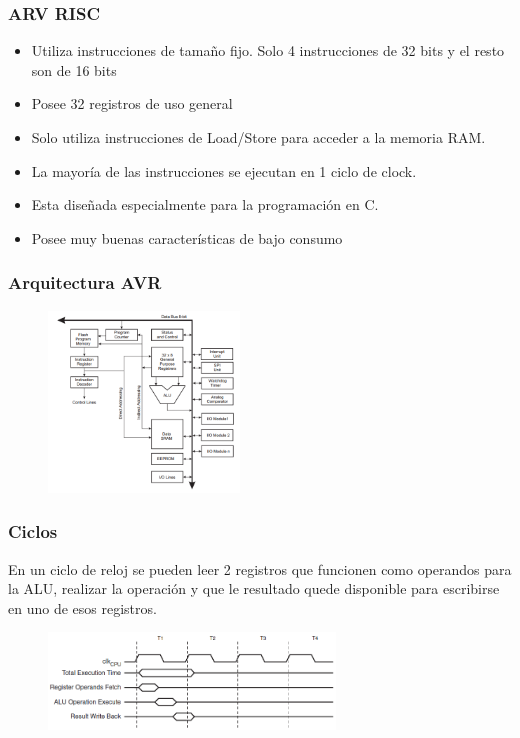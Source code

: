 \documentclass{beamer}
\begin{document}
\begin{frame}
\frametitle{ARV RISC}
\begin{itemize}
\item Utiliza instrucciones de tamaño fijo. Solo 4 instrucciones de 32 bits y el resto son de 16 bits
\item Posee 32 registros de uso general
\item Solo utiliza instrucciones de Load/Store para acceder a la memoria RAM.
\item La mayoría de las instrucciones se ejecutan en 1 ciclo de clock.
\item Esta diseñada especialmente para la programación en C.
\item Posee muy buenas características de bajo consumo
\end{itemize}
\end{frame}

\begin{frame}
\frametitle{Arquitectura AVR}
\begin{figure}[!h]
\centering
\includegraphics[width=2in]{avrarch}
\end{figure}
\end{frame}

\begin{frame}
\frametitle{Ciclos}
En un ciclo de reloj se pueden leer 2 registros que funcionen como operandos para la ALU, realizar la operación y que le resultado quede disponible para escribirse en uno de esos registros.
\begin{figure}[!h]
\centering
\includegraphics[width=3in]{ciclos}
\end{figure}
\end{frame}
\end{document}
